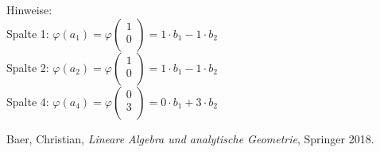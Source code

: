 \documentclass{article}
\begin{document}
Hinweise: \\
Spalte 1: $\varphi(a_1) = \varphi \begin{pmatrix}
    1 \\
    0 \\
\end{pmatrix} = 1 \cdot b_1 -1 \cdot b_2$ \\
Spalte 2: $\varphi(a_2) = \varphi \begin{pmatrix}
    1 \\
    0 \\
\end{pmatrix} = 1 \cdot b_1 -1 \cdot b_2$ \\
Spalte 4: $\varphi(a_4) = \varphi \begin{pmatrix}
    0 \\
    3 \\
\end{pmatrix} = 0 \cdot b_1 + 3 \cdot b_2$ \\





\newpage
\begin{thebibliography}{9}
    Baer, Christian,
    \emph{Lineare Algebra und analytische Geometrie},
    Springer 2018.
    \end{thebibliography}
\end{document}
